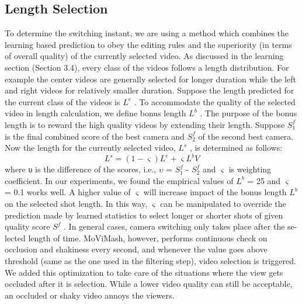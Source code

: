 \documentclass{sig-alternate}
\providecommand{\DIFadd}[1]{{\protect\color{blue}\uwave{#1}}} %
\providecommand{\DIFaddbegin}{} %
\providecommand{\DIFaddend}{} %
\begin{document}
\subsection{Length Selection}
\DIFaddbegin \DIFadd{I am a new sentence.
}\DIFaddend To determine the switching instant, we are using a method which
combines the learning based prediction to obey the editing rules and
the superiority (in terms of overall quality) of the currently selected
video. As discussed in the learning section (Section 3.4), every
class of the videos follows a length distribution. For example the
center videos are generally selected for longer duration while the
left and right videos for relatively smaller duration.
Suppose the length predicted for the current class of the videos
is $L^e$ . To accommodate the quality of the selected video in length
calculation, we define bonus length $L^b$ . The purpose of the bonus
length is to reward the high quality videos by extending their length.
Suppose $S^f_1$ is the final combined score of the best camera and $S^f_2$
of the second best camera. Now the length for the currently selected
video, $L^s$ , is determined as follows:
\[L^s = (1 - \varsigma)L^e + \varsigma L^bV\tag{18}\]
where υ is the difference of the scores, i.e., $\upsilon$ = $S^f_1$ - $S^f_2$
and $\varsigma$ is weighting coefficient. In our experiments, we found the empirical
values of $L^b$ = 25 and $\varsigma$ = 0.1 works well. A higher value of
$\varsigma$ will increase impact of the bonus length $L^b$ on the selected shot
length. In this way, $\varsigma$ can be manipulated to override the prediction
made by learned statistics to select longer or shorter shots of given
quality score $S^f$ .
In general cases, camera switching only takes place after the se-
lected length of time. MoViMash, however, performs continuous
check on occlusion and shakiness every second, and whenever the
value goes above threshold (same as the one used in the filtering
step), video selection is triggered. We added this optimization to
take care of the situations where the view gets occluded after it is
selection. While a lower video quality can still be acceptable, an
occluded or shaky video annoys the viewers.
\end{document}
